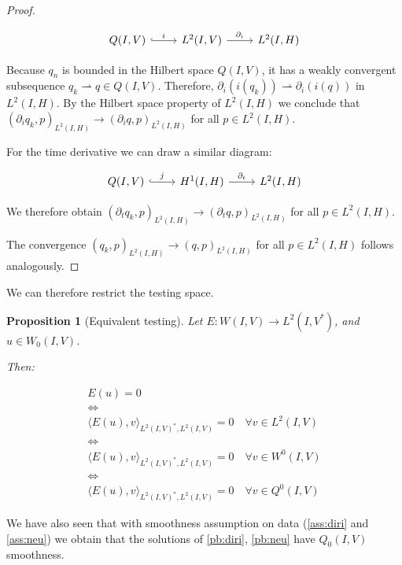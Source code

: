 \documentclass[english,a4paper,9pt,oneside]{scrbook}	%
\theoremstyle{break}
\newtheorem{prop}[equation]{Proposition}
\newenvironment{mproof}[1][\proofname]{%
  \begin{proof}[#1]$ $\par\nobreak\ignorespaces
}{%
  \end{proof}
}
\renewcommand*{\proofname}{Proof}
\theoremstyle{remark}
\newcommand{\weakc}{\rightharpoonup}
\begin{document}
\begin{appendices}
\begin{mproof}
\[\begin{tikzcd}
	{Q(I,V)} & {L^2(I,V)} & {L^2(I,H)}
	\arrow["i", hook, from=1-1, to=1-2]
	\arrow["{\partial_i}", from=1-2, to=1-3]
\end{tikzcd}\]

Because $q_n$ is bounded in the Hilbert space $Q(I,V)$, it has a weakly convergent subsequence $q_k\weakc q \in Q(I,V)$. Therefore, $\partial_i (i(q_k))\weakc \partial_i (i(q))$ in $L^2(I,H)$. By the Hilbert space property of $L^2(I,H)$ we conclude that $(\partial_i q_k,p)_{L^2(I,H)}\rightarrow (\partial_i q,p)_{L^2(I,H)}$ for all $p \in L^2(I,H)$.

For the time derivative we can draw a similar diagram:

\[\begin{tikzcd}
	{Q(I,V)} & {H^1(I,H)} & {L^2(I,H)}
	\arrow["j", hook, from=1-1, to=1-2]
	\arrow["{\partial_t}", from=1-2, to=1-3]
\end{tikzcd}\]

We therefore obtain $(\partial_t q_k,p)_{L^2(I,H)}\rightarrow (\partial_t q,p)_{L^2(I,H)}$ for all $p \in L^2(I,H)$.

The convergence $(q_k,p)_{L^2(I,H)}\rightarrow (q,p)_{L^2(I,H)}$ for all $p \in L^2(I,H)$ follows analogously.

\end{mproof}

We can therefore restrict the testing space.

\begin{prop}[Equivalent testing]
\label{prop:eq_test}
Let $E: W(I,V)\rightarrow L^2(I,V^*)$, and $u\in W_0(I,V)$.

Then:

\begin{align*}
E(u)=0 \\
\iff \\
\langle E(u), v\rangle_{L^2(I,V)^*, L^2(I,V)}=0 \quad \forall v \in L^2(I,V)\\
\iff \\
\langle E(u), v\rangle_{L^2(I,V)^*, L^2(I,V)}=0 \quad \forall v \in W^0(I,V)\\
\iff \\
\langle E(u), v\rangle_{L^2(I,V)^*, L^2(I,V)}=0 \quad \forall v \in Q^0(I,V)
\end{align*}

\end{prop}


We have also seen that with smoothness assumption on data (\cref{ass:diri} and \cref{ass:neu}) we obtain that the solutions of \cref{pb:diri}, \cref{pb:neu} have $Q_0(I,V)$ smoothness. 


\end{appendices}
\end{document}
